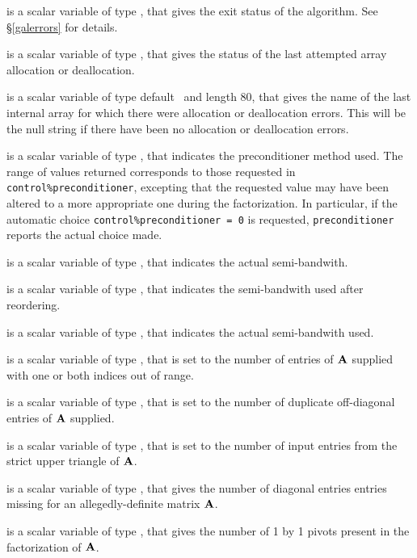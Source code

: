 \documentclass{galahad}
\begin{document}
\begin{description}

 is a scalar variable of type \integer, that gives the
exit status of the algorithm.
See \S\ref{galerrors}
for details.

 is a scalar variable of type \integer, that gives
the status of the last attempted array allocation or deallocation.

 is a scalar variable of type default \character\
and length 80, that  gives the name of the last internal array
for which there were allocation or deallocation errors.
This will be the null string if there have been no
allocation or deallocation errors.

 is a scalar variable of type \integer,
that indicates the preconditioner method used. The range of values returned
corresponds to those requested in {\tt control\%preconditioner},
excepting that the requested value may have been altered to a more
appropriate one during the factorization. In particular, if the automatic
choice {\tt control\%preconditioner = 0} is requested,
{\tt preconditioner} reports the actual choice made.

 is a scalar variable of type \integer,
that indicates the actual semi-bandwith.

 is a scalar variable of type \integer,
that indicates the semi-bandwith used after reordering.

 is a scalar variable of type \integer,
that indicates the actual semi-bandwith used.

 is a scalar variable of type \integer,
that is set to the number of
entries of ${\mathbf{A}}$ supplied with one or both indices out of range.

 is a scalar variable of type \integer,
that is set to the number of duplicate off-diagonal entries of ${\mathbf{A}}$ supplied.

 is a scalar variable of type \integer,
that is set to the number of input entries from the strict upper triangle
of ${\mathbf{A}}$.

 is a scalar variable of type \integer,
that gives the number of diagonal entries entries missing for an
allegedly-definite matrix ${\mathbf{A}}$.

 is a scalar variable of type \integer,
that gives the number of 1 by 1 pivots present in the factorization
of ${\mathbf{A}}$.


\end{description}
\end{document}

